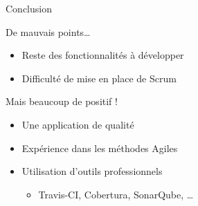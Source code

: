 \AntoineSpeak
\begin{frame}{Conclusion}
	\begin{alertblock}{De mauvais points\ldots}
		\begin{itemize}
			\item Reste des fonctionnalités à développer
			\item Difficulté de mise en place de Scrum
		\end{itemize}
	\end{alertblock}
	\vfill
	\begin{exampleblock}{Mais beaucoup de positif !}
		\begin{itemize}
			\item Une application de qualité
			\item Expérience dans les méthodes Agiles
			\item Utilisation d'outils professionnels
			\begin{itemize}
				\item Travis-CI, Cobertura, SonarQube, \ldots
			\end{itemize}
		\end{itemize}
	\end{exampleblock}
\end{frame}
